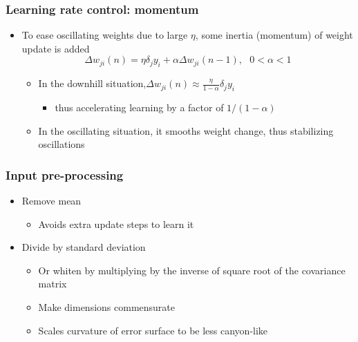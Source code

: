\documentclass[12pt,notes,mathserif]{beamer}
\begin{document}
\begin{frame}[c]
	\frametitle{Learning rate control: momentum}
	\begin{itemize}
		\item To ease oscillating weights due to large $\eta$, some inertia (momentum) of weight update is added
		      \[
			      \Delta w_{ji}(n)=\eta \delta_jy_i+\alpha\Delta w_{ji}(n-1), ~~~0<\alpha<1
		      \]\vspace*{-5mm}
		      \begin{itemize}
			      \item In the downhill situation,$\Delta w_{ji}(n)\approx \frac{\eta}{1-\alpha}\delta_jy_i$
			            \begin{itemize}
				            \item  thus accelerating learning by a factor of $1/(1-\alpha)$

			            \end{itemize}
			      \item In the oscillating situation, it smooths weight change, thus stabilizing oscillations

		      \end{itemize}
	\end{itemize}
\end{frame}
\begin{frame}[c]
	\frametitle{Input pre-processing}
	\begin{itemize}
		\item Remove mean
		      \begin{itemize}
			      \item  Avoids extra update steps to learn it

		      \end{itemize}
		\item Divide by standard deviation
		      \begin{itemize}
			      \item Or whiten by multiplying by the inverse of square root of the covariance matrix

			      \item Make dimensions commensurate

			      \item Scales curvature of error surface to be less canyon-like

		      \end{itemize}

	\end{itemize}

\end{frame}
\end{document}
